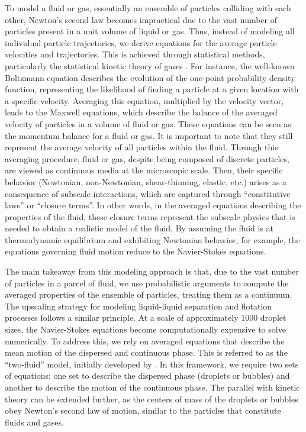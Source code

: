 To model a fluid or gas, essentially an ensemble of particles colliding with each other, Newton's second law becomes impractical due to the vast number of particles present in a unit volume of liquid or gas.
Thus, instead of modeling all individual particle trajectories, we derive equations for the average particle velocities and trajectories.
This is achieved through statistical methods, particularly the statistical kinetic theory of gases \citep{hansen2013theory,kardar2007statistical}.
For instance, the well-known Boltzmann equation describes the evolution of the one-point probability density function, representing the likelihood of finding a particle at a given location with a specific velocity.
Averaging this equation, multiplied by the velocity vector, leads to the Maxwell equations, which describe the balance of the averaged velocity of particles in a volume of fluid or gas.
These equations can be seen as the momentum balance for a fluid or gas.
It is important to note that they still represent the average velocity of all particles within the fluid.
Through this averaging procedure, fluid or gas, despite being composed of discrete particles, are viewed as continuous media at the microscopic scale.
Then, their specific behavior (Newtonian, non-Newtonian, shear-thinning, elastic, etc.) arises as a consequence of subscale interactions, which are captured through ``constitutive laws'' or ``closure terms''.
In other words, in the averaged equations describing the properties of the fluid, these closure terms represent the subscale physics that is needed to obtain a realistic model of the fluid.
By assuming the fluid is at thermodynamic equilibrium and exhibiting Newtonian behavior, for example, the equations governing fluid motion reduce to the Navier-Stokes equations. 

The main takeaway from this modeling approach is that, due to the vast number of particles in a parcel of fluid, we use probabilistic arguments to compute the averaged properties of the ensemble of particles, treating them as a continuum.
The upscaling strategy for modeling liquid-liquid separation and flotation processes follows a similar principle.
At a scale of approximately $1000$ droplet sizes, the Navier-Stokes equations become computationally expensive to solve numerically.
To address this, we rely on averaged equations that describe the mean motion of the dispersed and continuous phase.
This is referred to as the ``two-fluid'' model, initially developed by \citet{drew1983mathematical}.
In this framework, we require two sets of equations: one set to describe the dispersed phase (droplets or bubbles) and another to describe the motion of the continuous phase.
The parallel with kinetic theory can be extended further, as the centers of mass of the droplets or bubbles obey Newton's second law of motion, similar to the particles that constitute fluids and gases.


